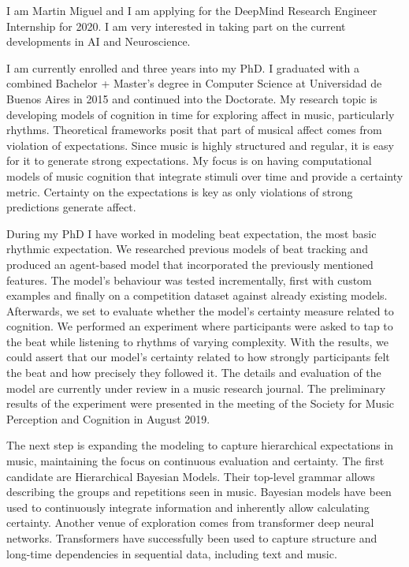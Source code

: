 I am Martin Miguel and I am applying for the DeepMind Research Engineer 
Internship for 2020. I am very interested in taking part on the current
developments in AI and Neuroscience. 

I am currently enrolled and three years into my PhD. I graduated with a
combined Bachelor + Master's degree in Computer Science at Universidad de
Buenos Aires in 2015 and continued into the Doctorate. My research topic is
developing models of cognition in time for exploring affect in music,
particularly rhythms. Theoretical frameworks posit that part of musical affect
comes from violation of expectations. Since music is highly structured and
regular, it is easy for it to generate strong expectations. My focus is on
having computational models of music cognition that integrate stimuli over time
and provide a certainty metric. Certainty on the expectations is key as only
violations of strong predictions generate affect.

During my PhD I have worked in modeling beat expectation, the most basic
rhythmic expectation. We researched previous models of beat tracking and 
produced an agent-based model that incorporated the previously mentioned
features.  The model's behaviour was tested incrementally, first with custom
examples and finally on a competition dataset against already existing models.
Afterwards, we set to evaluate whether the model's certainty measure related to
cognition. We performed an experiment where participants were asked to tap to
the beat while listening to rhythms of varying complexity. With the results, we
could assert that our model's certainty related to how strongly participants
felt the beat and how precisely they followed it. The details and evaluation of
the model are currently under review in a music research journal. The
preliminary results of the experiment were presented in the meeting of the
Society for Music Perception and Cognition in August 2019. 

The next step is expanding the modeling to capture hierarchical expectations in
music, maintaining the focus on continuous evaluation and certainty. The first
candidate are Hierarchical Bayesian Models. Their top-level grammar allows
describing the groups and repetitions seen in music.  Bayesian models have been
used to continuously integrate information and inherently allow calculating
certainty. Another venue of exploration comes from transformer deep neural
networks. Transformers have successfully been used to capture structure and
long-time dependencies in sequential data, including text and music. 

